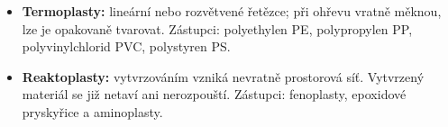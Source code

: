\begin{itemize}
\item \textbf{Termoplasty:} lineární nebo rozvětvené řetězce; při ohřevu vratně měknou, lze je opakovaně tvarovat. Zástupci: polyethylen PE, polypropylen PP, polyvinylchlorid PVC, polystyren PS.
\item \textbf{Reaktoplasty:} vytvrzováním vzniká nevratně prostorová síť. Vytvrzený materiál se již netaví ani nerozpouští. Zástupci: fenoplasty, epoxidové pryskyřice a aminoplasty.
\end{itemize}
